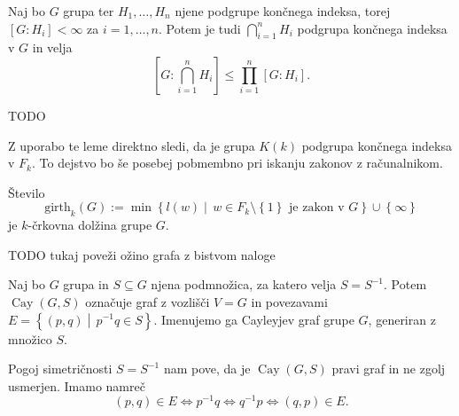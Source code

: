 \documentclass[mat1, tisk]{fmfdelo}
\begin{document}
\begin{lema}
\label{lem_koncni_indeks_koncnega_preseka}
Naj bo $G$ grupa ter $H_1, \ldots, H_n$ njene podgrupe končnega indeksa, torej $[G: H_i] < \infty$ za $i = 1, \ldots, n$. Potem je tudi $\bigcap_{i = 1}^{n} H_i$ podgrupa končnega indeksa v $G$ in velja
\begin{equation*}
\left[ G: \bigcap_{i = 1}^{n} H_i \right]  \le \prod_{i=1}^{n} [G: H_i].  
\end{equation*} 
\end{lema}

\begin{dokaz}
TODO
\end{dokaz}
Z uporabo te leme direktno sledi, da je grupa $K(k)$ podgrupa končnega indeksa v $F_k$. To dejstvo bo še posebej pobmembno pri iskanju zakonov z računalnikom.

\begin{definicija}
\label{def_ozina}
Število \begin{equation*}
\text{girth}_{k}(G) := \min \left\{ l(w)  \middle|\,  w \in F_k \setminus \left\{ 1\right\} \text{ je zakon v } G  \right\} \cup \left\{ \infty\right\} 
\end{equation*}  
je $k$-črkovna dolžina grupe $G$.  
\end{definicija}

TODO tukaj poveži ožino grafa z bistvom naloge

\begin{definicija}
\label{def_cayleyev_graf}
Naj bo $G$ grupa in $S \subseteq G$ njena podmnožica, za katero velja $S = S^{-1}$. Potem $\operatorname{Cay}(G, S)$ označuje graf z vozlišči $V = G$ in povezavami
$E = \left\{ (p, q) \middle|\, p^{-1}q \in  S \right\}$. Imenujemo ga Cayleyjev graf grupe $G$, generiran z množico $S$.  
\end{definicija}

\begin{opomba}
Pogoj simetričnosti $S = S^{-1}$ nam pove, da je $\operatorname{Cay}(G, S)$ pravi graf in ne zgolj usmerjen. Imamo namreč \begin{equation*}
(p,q) \in  E \iff p^{-1}q \iff q^{-1}p \iff (q,p) \in  E.
\end{equation*}  
\end{opomba}
\end{document}
